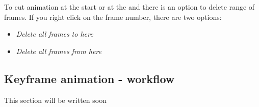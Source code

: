 	To cut animation at the start or at the and there is an option to delete range of frames. If you right click on the frame number, there are two options:
	\begin{itemize}
		\item \emph{Delete all frames to here}
		\item \emph{Delete all frames from here}
	\end{itemize}
	
	
	


\subsection{Keyframe animation - workflow}\label{keyframe-animation}

	This section will be written soon